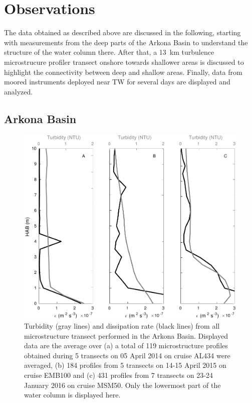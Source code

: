 \section{Observations}

 The data obtained as described above are discussed in the following, starting 
with measurements from 
the 
deep parts of the Arkona Basin to understand the structure of the water 
column there. After that, a 13~km turbulence microstrucure profiler transect 
onshore towards shallower areas is discussed to highlight the connectivity 
between deep and shallow areas. Finally, data from moored 
instruments deployed near TW for several days are displayed and analyzed.

\subsection{Arkona Basin}

   \begin{figure}[ht]
\includegraphics[width=15cm]{bilder/arkona_mss.pdf}
 \caption{Turbidity (gray lines) and dissipation rate (black lines) from all 
microstructure transect performed in the Arkona Basin. Displayed data are the 
average over (a) a total of 119 microstructure profiles obtained during 5 
transects on 05 April 2014 on cruise AL434 were averaged, (b) 184 profiles from 
5 transects on 14-15 April 2015 on cruise EMB100 and (c) 431 profiles from 7 
transects on 23-24 January 2016 on cruise MSM50. Only the lowermost part of 
the water column is displayed here.}
 \label{abmss}
 \end{figure}
 
